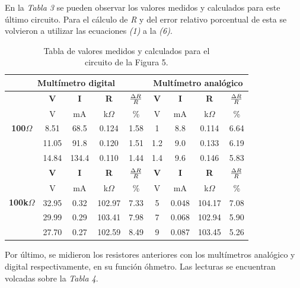 \documentclass{article}
\begin{document}
\noindent En la \textit{Tabla 3} se pueden observar los valores medidos y calculados para este último circuito. Para el cálculo de \textit{R} y del error relativo porcentual de esta se volvieron a utilizar las ecuaciones \textit{(1)} a la \textit{(6)}.
\bigskip\medskip

\newpage
\begin{table}[!hbt]
	\begin{center}

		\begin{tabular}{|c|c|c|c|c|c|c|c|c|} \hline
			\multicolumn{5}{|c|}{\textbf{Multímetro digital}} & \multicolumn{4}{c|}{\textbf{Multímetro analógico}} \\ \hline
			\multirow{5}{*}{\textbf{100$\Omega$}} 
			& \textbf{V} & \textbf{I} & \textbf{R} & \textbf{${\Delta R \over R}$} & \textbf{V} & \textbf{I} & \textbf{R} & \textbf{${\Delta R \over R}$} \\\cline{2-9}
			& V & mA & k$\Omega$ & \% & V & mA & k$\Omega$ & \% \\\cline{2-9}
			& 8.51 & 68.5 & 0.124 & 1.58 & 1 & 8.8 & 0.114 & 6.64 \\\cline{2-9}
			& 11.05 & 91.8 & 0.120 & 1.51 & 1.2 & 9.0 & 0.133 &  6.19 \\\cline{2-9}
			& 14.84 & 134.4 & 0.110 & 1.44 & 1.4 & 9.6 & 0.146 & 5.83 \\ \hline
			\multirow{5}{*}{\textbf{100k$\Omega$}} 
			& \textbf{V} & \textbf{I} & \textbf{R} & \textbf{${\Delta R \over R}$} & \textbf{V} & \textbf{I} & \textbf{R} & \textbf{${\Delta R \over R}$} \\\cline{2-9}
			& V & mA & k$\Omega$ & \% & V & mA & k$\Omega$ & \% \\\cline{2-9}
			& 32.95 & 0.32 & 102.97 & 7.33 & 5 & 0.048 & 104.17 & 7.08 \\\cline{2-9}
			& 29.99 & 0.29 & 103.41 & 7.98 & 7 & 0.068 & 102.94 & 5.90\\\cline{2-9}
			& 27.70 & 0.27 & 102.59 & 8.49 & 9 & 0.087 & 103.45 & 5.26 \\ \hline
		\end{tabular}

	\caption{Tabla de valores medidos y calculados para el\\ circuito de la Figura 5.}
	\end{center}
\end{table}
\bigskip




	Por último, se midieron los resistores anteriores con los multímetros analógico y digital respectivamente, en su función óhmetro. Las lecturas se encuentran volcadas sobre la \textit{Tabla 4}.
\bigskip\bigskip
\end{document}
